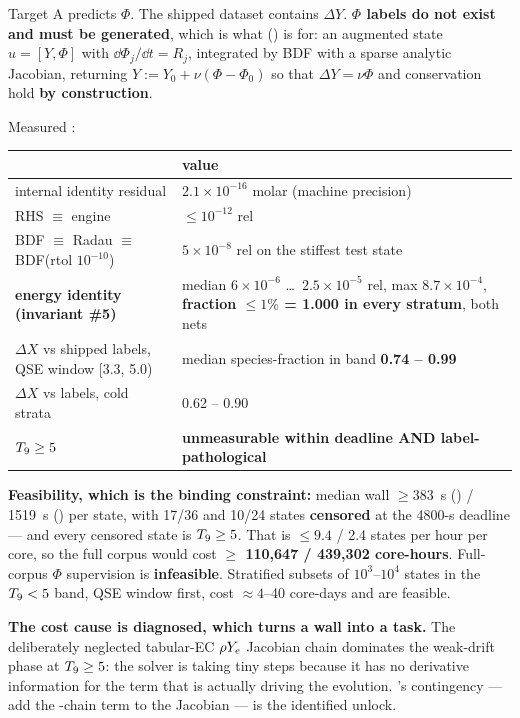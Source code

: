 Target A predicts $\Phi$. The shipped dataset contains $\Delta Y$.
\textbf{$\Phi$ labels do not exist and must be generated}, which is what
 () is for: an augmented state
$u = [Y, \Phi]$ with $\dd\Phi_j/\dd t = R_j$, integrated by BDF
\citep{hairer1996} with a sparse analytic Jacobian, returning
$Y := Y_0 + \nu(\Phi - \Phi_0)$ so that $\Delta Y = \nu\Phi$ and conservation
hold \textbf{by construction}.

Measured :

\begingroup\small
\begin{tabularx}{\textwidth}{@{}L{5.2cm} Y@{}}
\toprule
 & \textbf{value} \\
\midrule
internal identity residual & $2.1 \times 10^{-16}$ molar (machine precision) \\
RHS $\equiv$ engine & $\le 10^{-12}$ rel \\
BDF $\equiv$ Radau $\equiv$ BDF(rtol $10^{-10}$) & $5 \times 10^{-8}$ rel on
  the stiffest test state \\
\textbf{energy identity (invariant \#5)} & median $6 \times 10^{-6}$ \ldots\
  $2.5 \times 10^{-5}$ rel, max $8.7 \times 10^{-4}$, \textbf{fraction
  $\le 1\%$ = 1.000 in every stratum}, both nets \\
$\Delta X$ vs shipped labels, QSE window [3.3, 5.0) & median species-fraction
  in band \textbf{0.74 -- 0.99} \\
$\Delta X$ vs labels, cold strata & 0.62 -- 0.90 \\
$T_{9} \ge 5$ & \textbf{unmeasurable within deadline AND label-pathological} \\
\bottomrule
\end{tabularx}
\endgroup

\textbf{Feasibility, which is the binding constraint:} median wall $\ge 383$~s
(\msn{80}) / 1519~s (\msn{151}) per state, with 17/36 and 10/24 states
\textbf{censored} at the 4800-s deadline --- and every censored state is
$T_{9} \ge 5$. That is $\le 9.4$ / 2.4 states per hour per core, so the full
corpus would cost \textbf{$\ge$ 110,647 / 439,302 core-hours}. Full-corpus
$\Phi$ supervision is \textbf{infeasible}. Stratified subsets of
$10^3$--$10^4$ states in the $T_{9} < 5$ band, QSE window first, cost
$\approx 4$--40 core-days and are feasible.

\textbf{The cost cause is diagnosed, which turns a wall into a task.} The
deliberately neglected tabular-EC $\rho Y_{e}$ Jacobian chain dominates the
weak-drift phase at $T_{9} \ge 5$: the solver is taking tiny steps because it has
no derivative information for the term that is actually driving the evolution.
\code{ADR 0006}'s contingency --- add the \Ye-chain term to the Jacobian --- is
the identified unlock.

